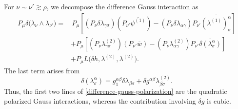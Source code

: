 \documentclass[11pt,letterpaper,reqno]{amsart}
\numberwithin{equation}{section}
\theoremstyle{definition}
\theoremstyle{remark}
\begin{document}
 
For \(\nu\sim\nu'\gtrsim\rho\), we  decompose the difference Gauss
interaction as
\begin{align}
P_\mu\delta
\bigl(\lambda_\nu\wedge\lambda_{\nu'}\bigr)
=&\,
P_\mu
\left[
(P_\nu\delta\lambda_{\gamma\sigma})
(P_{\nu'}\overline{\psi^{(1)}})
-
(P_\nu\delta\lambda_{\alpha\gamma})
P_{\nu'}\overline{(\lambda^{(1)})^\alpha_\sigma}
\right]
\nonumber\\
&+
P_\mu
\left[
(P_\nu\lambda_{\gamma\sigma}^{(2)})
(P_{\nu'}\overline{w})
-
(P_\nu\lambda_{\alpha\gamma}^{(2)})
P_{\nu'}\overline{
\delta(\lambda^\alpha_\sigma)}
\right]
\nonumber\\
&+
P_\mu L
\bigl(
\delta h,\lambda^{(2)},\lambda^{(2)}
\bigr).
\label{difference-gauss-polarization}
\end{align}
The last term arises from
\[
\delta(\lambda^\alpha_\sigma)
=
g_1^{\alpha\beta}\delta\lambda_{\beta\sigma}
+
\delta g^{\alpha\beta}\lambda_{\beta\sigma}^{(2)}.
\]
Thus, the first two lines of \eqref{difference-gauss-polarization} are the
quadratic polarized Gauss interactions, whereas the contribution involving
\(\delta g\) is cubic.
\end{document}
